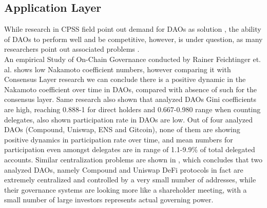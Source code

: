 \documentclass{article}
\begin{document}
\begin{CJK}{UTF8}{gbsn}
\begin{multicols}{2}
        \subsection{Application Layer}
        While research in CPSS field point out demand for DAOs as solution \cite{Fei2016}\cite{Wang2022}\cite{Juanjuan2023}, the ability of DAOs to perform well and be competitive, however, is under question, as many researchers point out associated problems \cite{Rainer2023}\cite{Marcella2016}\cite{Xuan2024}.  \\An empirical Study of On-Chain Governance conducted by Rainer Feichtinger et. al. \cite{Rainer2023} shows low Nakamoto coefficient numbers, however comparing it with Consensus Layer research \cite{Dominic2023} we can conclude there is a positive dynamic in the Nakamoto coefficient over time in DAOs, compared with absence of such for the consensus layer. Same research\cite{Rainer2023} also shown that analyzed DAOs Gini coefficients\cite{Lidia2012} are high, reaching 0.888-1 for direct holders and 0.667-0.980 range when counting delegates, also shown participation rate in DAOs are low. Out of four analyzed DAOs (Compound, Uniswap, ENS and Gitcoin), none of them are showing positive dynamics in participation rate over time, and mean numbers for participation even amongst delegates are in range of 1.1-9.9\% of total delegated accounts. Similar centralization problems are shown in \cite{Robin22}, which concludes that two analyzed DAOs, namely Compound and Uniswap DeFi protocols in fact are extremely centralized and controlled by a very small number of addresses, while their governance systems are looking more like a shareholder meeting, with a small number of large investors represents actual governing power.



\end{multicols}
\end{CJK}
\end{document}
